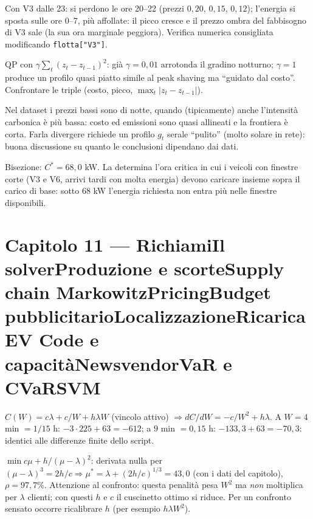 \documentclass[11pt,a4paper]{article}
\newcounter{cap}
\newcounter{sol}[cap]
\newcommand{\capitolo}[1]{\setcounter{cap}{#1}\section*{Capitolo #1 --- \capnome{#1}}}
\newcommand{\capnome}[1]{%
  \ifcase#1\or\or Richiami\or Il solver\or Produzione e scorte\or Supply chain\or
  Markowitz\or Pricing\or Budget pubblicitario\or Localizzazione\or Ricarica EV\or
  Code e capacità\or Newsvendor\or VaR e CVaR\or SVM\fi}
\begin{document}
\begin{soluzione}
Con V3 dalle 23: si perdono le ore 20--22 (prezzi $0{,}20$, $0{,}15$, $0{,}12$);
l'energia si sposta sulle ore 0--7, più affollate: il picco cresce e il prezzo
ombra del fabbisogno di V3 sale (la sua ora marginale peggiora). Verifica numerica
consigliata modificando \texttt{flotta["V3"]}.
\end{soluzione}

\begin{soluzione}
QP con $\gamma\sum_t (z_t - z_{t-1})^2$: già $\gamma = 0{,}01$ arrotonda il gradino
notturno; $\gamma = 1$ produce un profilo quasi piatto simile al peak shaving ma
``guidato dal costo''. Confrontare le triple (costo, picco, $\max_t |z_t - z_{t-1}|$).
\end{soluzione}

\begin{soluzione}[emissioni]
Nel dataset i prezzi bassi sono di notte, quando (tipicamente) anche l'intensità
carbonica è più bassa: costo ed emissioni sono quasi allineati e la frontiera è
corta. Farla divergere richiede un profilo $g_t$ serale ``pulito'' (molto solare in
rete): buona discussione su quanto le conclusioni dipendano dai dati.
\end{soluzione}

\begin{soluzione}
Bisezione: $C^* = 68{,}0$ kW. La determina l'ora critica in cui i veicoli con
finestre corte (V3 e V6, arrivi tardi con molta energia) devono caricare insieme
sopra il carico di base: sotto 68 kW l'energia richiesta non entra più nelle
finestre disponibili.
\end{soluzione}

\capitolo{11}

\begin{soluzione}[verifica]
$C(W) = c\lambda + c/W + h\lambda W$ (vincolo attivo)
$\Rightarrow dC/dW = -c/W^2 + h\lambda$. A $W = 4$ min $= 1/15$ h:
$-3 \cdot 225 + 63 = -612$; a $9$ min $= 0{,}15$ h: $-133{,}3 + 63 = -70{,}3$:
identici alle differenze finite dello script.
\end{soluzione}

\begin{soluzione}
$\min c\mu + h/(\mu - \lambda)^2$: derivata nulla per
$(\mu - \lambda)^3 = 2h/c \Rightarrow \mu^* = \lambda + (2h/c)^{1/3} = 43{,}0$
(con i dati del capitolo), $\rho = 97{,}7\%$. Attenzione al confronto: questa
penalità pesa $W^2$ ma \emph{non} moltiplica per $\lambda$ clienti; con questi
$h$ e $c$ il cuscinetto ottimo si riduce. Per un confronto sensato occorre
ricalibrare $h$ (per esempio $h\lambda W^2$).
\end{soluzione}
\end{document}
